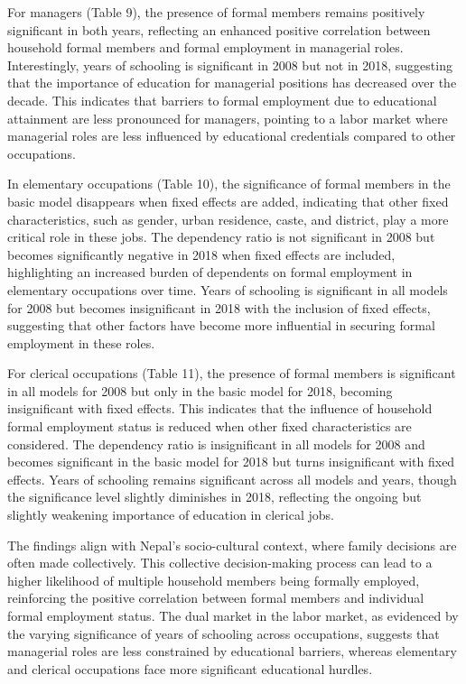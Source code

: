  For managers (Table 9), the presence of formal members remains positively significant in both years, reflecting an enhanced positive correlation between household formal members and formal employment in managerial roles. Interestingly, years of schooling is significant in 2008 but not in 2018, suggesting that the importance of education for managerial positions has decreased over the decade. This indicates that barriers to formal employment due to educational attainment are less pronounced for managers, pointing to a labor market where managerial roles are less influenced by educational credentials compared to other occupations.
 
 In elementary occupations (Table 10), the significance of formal members in the basic model disappears when fixed effects are added, indicating that other fixed characteristics, such as gender, urban residence, caste, and district, play a more critical role in these jobs. The dependency ratio is not significant in 2008 but becomes significantly negative in 2018 when fixed effects are included, highlighting an increased burden of dependents on formal employment in elementary occupations over time. Years of schooling is significant in all models for 2008 but becomes insignificant in 2018 with the inclusion of fixed effects, suggesting that other factors have become more influential in securing formal employment in these roles.
 
 For clerical occupations (Table 11), the presence of formal members is significant in all models for 2008 but only in the basic model for 2018, becoming insignificant with fixed effects. This indicates that the influence of household formal employment status is reduced when other fixed characteristics are considered. The dependency ratio is insignificant in all models for 2008 and becomes significant in the basic model for 2018 but turns insignificant with fixed effects. Years of schooling remains significant across all models and years, though the significance level slightly diminishes in 2018, reflecting the ongoing but slightly weakening importance of education in clerical jobs.

 
 The findings align with Nepal's socio-cultural context, where family decisions are often made collectively. This collective decision-making process can lead to a higher likelihood of multiple household members being formally employed, reinforcing the positive correlation between formal members and individual formal employment status. The dual market in the labor market, as evidenced by the varying significance of years of schooling across occupations, suggests that managerial roles are less constrained by educational barriers, whereas elementary and clerical occupations face more significant educational hurdles.
 
